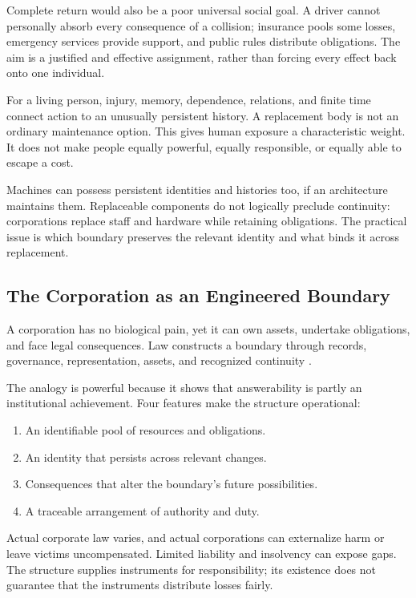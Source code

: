 Complete return would also be a poor universal social goal. A driver cannot personally absorb every consequence of a collision; insurance pools some losses, emergency services provide support, and public rules distribute obligations. The aim is a justified and effective assignment, rather than forcing every effect back onto one individual.

For a living person, injury, memory, dependence, relations, and finite time connect action to an unusually persistent history. A replacement body is not an ordinary maintenance option. This gives human exposure a characteristic weight. It does not make people equally powerful, equally responsible, or equally able to escape a cost.

Machines can possess persistent identities and histories too, if an architecture maintains them. Replaceable components do not logically preclude continuity: corporations replace staff and hardware while retaining obligations. The practical issue is which boundary preserves the relevant identity and what binds it across replacement.

\subsection{The Corporation as an Engineered Boundary}

A corporation has no biological pain, yet it can own assets, undertake obligations, and face legal consequences. Law constructs a boundary through records, governance, representation, assets, and recognized continuity \cite{dewey1926historic}.

The analogy is powerful because it shows that answerability is partly an institutional achievement. Four features make the structure operational:
\begin{enumerate}
 \item An identifiable pool of resources and obligations.
 \item An identity that persists across relevant changes.
 \item Consequences that alter the boundary's future possibilities.
 \item A traceable arrangement of authority and duty.
\end{enumerate}

Actual corporate law varies, and actual corporations can externalize harm or leave victims uncompensated. Limited liability and insolvency can expose gaps. The structure supplies instruments for responsibility; its existence does not guarantee that the instruments distribute losses fairly.

